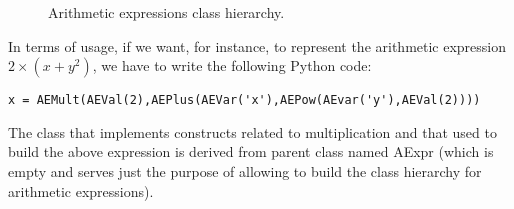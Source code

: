 \documentclass[11pt]{article}
\begin{document}
\begin{figure}
\begin{center}
\caption{Arithmetic expressions class hierarchy.}
\label{aexprs}
\end{center}
\end{figure}

In terms of usage, if we want, for instance, to represent the arithmetic expression $2 \times (x + y^2)$, we have to write the following Python code:
\begin{verbatim}
x = AEMult(AEVal(2),AEPlus(AEVar('x'),AEPow(AEvar('y'),AEVal(2))))
\end{verbatim}
The class that implements constructs related to multiplication and that used to build the above expression is derived from parent class named AExpr (which is empty and serves just the purpose of allowing to build the class hierarchy for arithmetic expressions).
\end{document}
